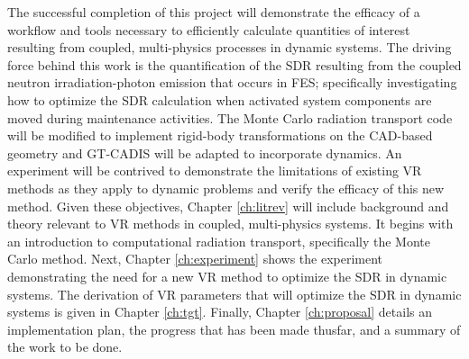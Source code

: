 The successful completion of this project will demonstrate the efficacy of a workflow and tools
necessary to efficiently calculate quantities of interest resulting from
coupled, multi-physics processes in dynamic systems.  
The driving force behind this work is the quantification of the
SDR resulting from the coupled neutron
irradiation-photon emission that occurs in FES;
specifically investigating how to optimize the SDR calculation when %
activated system components are moved during maintenance activities.
The Monte Carlo radiation transport code will
be modified to implement rigid-body transformations on the CAD-based geometry
and GT-CADIS will be adapted to
incorporate dynamics.  An experiment will be contrived to demonstrate the
limitations of existing VR methods as they apply to dynamic problems and verify
the efficacy of this new method.  Given these objectives, Chapter \ref{ch:litrev}
will include background and theory relevant to VR methods in coupled,
multi-physics systems.  
It begins with an introduction to computational
radiation transport, specifically the Monte Carlo method.
Next, Chapter \ref{ch:experiment} shows the experiment demonstrating the need
for a new VR method to optimize the SDR in dynamic systems.  The derivation of
VR parameters that will optimize the SDR in dynamic systems is given in
Chapter \ref{ch:tgt}. Finally, Chapter \ref{ch:proposal} details an implementation plan, 
the progress that has been made thusfar, and a summary of the
work to be done.
